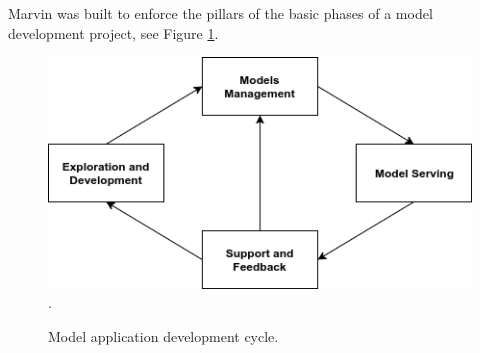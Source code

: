 \documentclass[twoside,11pt]{article}
\begin{document}
Marvin was built to enforce the pillars of the basic phases of a model development project, see Figure \ref{fig_cycle}. 
\begin{figure}[h]
\centering
\includegraphics[scale=0.6]{fig/dev-cycle.png}
\DeclareGraphicsExtensions.
\caption{Model application development cycle.}
\label{fig_cycle}
\end{figure}
\end{document}
